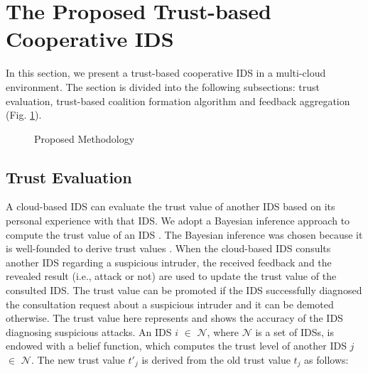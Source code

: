 \documentclass[conference]{IEEEtran}
\begin{document}
\section{The Proposed Trust-based Cooperative IDS}

In this section, we present a trust-based cooperative IDS in a multi-cloud environment. The section is divided into the following subsections: trust evaluation, trust-based coalition formation algorithm and feedback aggregation (Fig. \ref{fig1}).


\begin{figure}[!ht]

\centering
{}
\caption{Proposed Methodology}
\label{fig1}
\end{figure}

\subsection{Trust Evaluation}

A cloud-based IDS can evaluate the trust value of another IDS based on its personal experience with that IDS. We adopt
a Bayesian inference approach to compute the trust value of an IDS \cite{josang2002beta}. The Bayesian inference was chosen because it is well-founded to derive trust values \cite{yahyaoui2012trust}. When the cloud-based IDS consults another IDS regarding a suspicious intruder, the received feedback and the revealed result (i.e., attack or not) are used to update the trust value of the consulted IDS. The trust value can be promoted if the IDS successfully diagnosed the consultation request about a suspicious intruder and it can be demoted otherwise. The trust value here represents and shows the accuracy of the IDS diagnosing suspicious attacks. An IDS $i$ $\in$ $\mathcal{N}$, where $\mathcal{N}$  is a set of IDSs, is endowed with a belief function, which computes the trust level of another IDS $j$ $\in$ $\mathcal{N}$. The
new trust value $t'_{j}$ is derived from the old trust value $t_{j}$ as follows:
\end{document}
